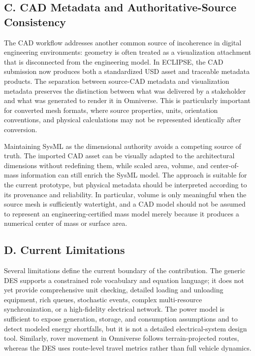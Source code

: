 \subsection{C. CAD Metadata and Authoritative-Source Consistency}

The CAD workflow addresses another common source of incoherence in digital engineering environments: geometry is often treated as a visualization attachment that is disconnected from the engineering model. In ECLIPSE, the CAD submission now produces both a standardized USD asset and traceable metadata products. The separation between source-CAD metadata and visualization metadata preserves the distinction between what was delivered by a stakeholder and what was generated to render it in Omniverse. This is particularly important for converted mesh formats, where source properties, units, orientation conventions, and physical calculations may not be represented identically after conversion.

Maintaining SysML as the dimensional authority avoids a competing source of truth. The imported CAD asset can be visually adapted to the architectural dimensions without redefining them, while scaled area, volume, and center-of-mass information can still enrich the SysML model. The approach is suitable for the current prototype, but physical metadata should be interpreted according to its provenance and reliability. In particular, volume is only meaningful when the source mesh is sufficiently watertight, and a CAD model should not be assumed to represent an engineering-certified mass model merely because it produces a numerical center of mass or surface area.

\subsection{D. Current Limitations}

Several limitations define the current boundary of the contribution. The generic DES supports a constrained role vocabulary and equation language; it does not yet provide comprehensive unit checking, detailed loading and unloading equipment, rich queues, stochastic events, complex multi-resource synchronization, or a high-fidelity electrical network. The power model is sufficient to expose generation, storage, and consumption assumptions and to detect modeled energy shortfalls, but it is not a detailed electrical-system design tool. Similarly, rover movement in Omniverse follows terrain-projected routes, whereas the DES uses route-level travel metrics rather than full vehicle dynamics.

